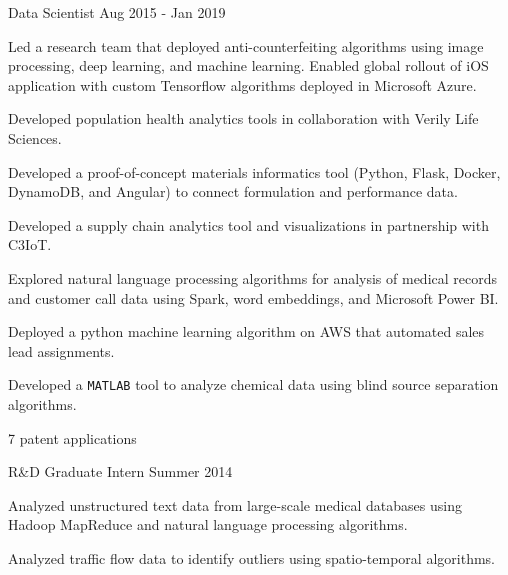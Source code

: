 \begin{cventries}
  \cventry
    {Data Scientist} %
    {} %
    {} %
    {Aug 2015 - Jan 2019} %
    {
      \begin{cvitems} %
      \item {Led a research team that deployed anti-counterfeiting algorithms using image
          processing, deep learning, and machine learning. Enabled global
          rollout of iOS application with custom Tensorflow algorithms deployed in
          Microsoft Azure.}
        \item {Developed population health analytics tools in collaboration with Verily 
            Life Sciences.}
        \item {Developed a proof-of-concept materials informatics tool (Python, Flask,
            Docker, DynamoDB, and Angular) to connect formulation and performance data.}
        \item {Developed a supply chain analytics tool and visualizations in partnership
            with C3IoT.}
        \item {Explored natural language processing algorithms for analysis of medical
            records and customer call data using Spark, word embeddings, and
            Microsoft Power BI.}
        \item {Deployed a python machine learning algorithm on AWS that automated sales
            lead assignments.}
        \item {Developed a {\texttt{MATLAB}} tool to analyze chemical data using blind source
            separation algorithms.}
        \item {7 patent applications}
      \end{cvitems}
    }

  \cventry
    {R\&D Graduate Intern} %
    {} %
    {} %
    {Summer 2014} %
    {
      \begin{cvitems} %
      \item {Analyzed unstructured text data from large-scale medical
        databases using Hadoop MapReduce and natural language processing
        algorithms.}
      \item {Analyzed traffic flow data to identify outliers using spatio-temporal
        algorithms.}
      \end{cvitems}
    }


\end{cventries}
